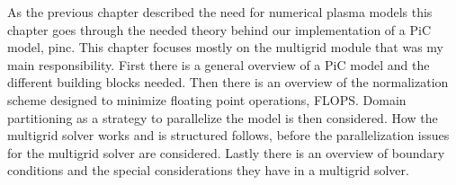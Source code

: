 

As the previous chapter described the need for numerical plasma models this chapter
goes through the needed theory behind our implementation of a PiC model, pinc.
This chapter focuses mostly on the multigrid module that was my main responsibility.
First there is a general overview of a PiC model and the different building blocks
needed. Then there is an overview of the normalization scheme designed to minimize
floating point operations, FLOPS. Domain partitioning as a strategy to parallelize
the model is then considered. How the multigrid solver works and is structured follows,
before the parallelization issues for the multigrid solver are considered.
Lastly there is an overview of boundary conditions and the special considerations
they have in a multigrid solver.
